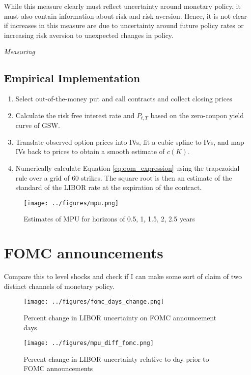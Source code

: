 \documentclass[11pt]{article}
\begin{document}
While this measure clearly must reflect uncertainty around monetary policy, it must also contain information about risk and risk aversion. Hence, it is not clear if increases in this measure are due to uncertainty around future policy rates or increasing risk aversion to unexpected changes in policy. 

\textit{Measuring }
\subsection{Empirical Implementation}
\begin{enumerate}
	\item Select out-of-the-money put and call contracts and collect closing prices
	\item Calculate the risk free interest rate and $P_{t, T}$ based on the zero-coupon yield curve of GSW. 
	\item Translate observed option prices into IVs, fit a cubic spline to IVs, and map IVs back to prices to obtain a smooth estimate of $c(K)$.
	\item Numerically calculate Equation \ref{eq:oom_expression} using the trapezoidal rule over a grid of 60 strikes. The square root is then an estimate of the standard of the LIBOR rate at the expiration of the contract.
\end{enumerate}
\begin{figure}
	\centering
	\texttt{[image: ../figures/mpu.png]}
	\caption{Estimates of MPU for horizons of 0.5, 1, 1.5, 2, 2.5 years}
	\label{fig:mpu}
\end{figure}

\section{FOMC announcements}

Compare this to level shocks and check if I can make some sort of claim of two distinct channels of monetary policy. 
\begin{figure}
	\centering
	\texttt{[image: ../figures/fomc\_days\_change.png]}
	\caption{Percent change in LIBOR uncertainty on FOMC announcement days}
	\label{fig:fomc_days}
\end{figure}
\begin{figure}
	\centering
	\texttt{[image: ../figures/mpu\_diff\_fomc.png]}
	\caption{Percent change in LIBOR uncertainty relative to day prior to FOMC announcements}
	\label{fig:fomc_cycle_chg}
\end{figure}
\end{document}
